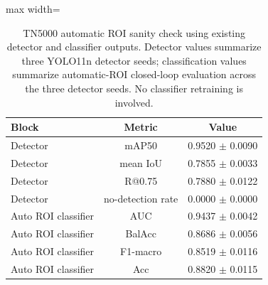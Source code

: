 \begin{table}[t]
    \centering
    \small
    \caption{TN5000 automatic ROI sanity check using existing detector and classifier outputs. Detector values summarize three YOLO11n detector seeds; classification values summarize automatic-ROI closed-loop evaluation across the three detector seeds. No classifier retraining is involved.}
    \label{tab:tn5000_auto_roi_summary}
    \begin{adjustbox}{max width=\columnwidth}
    \begin{tabular}{lcc}
        \toprule
        Block & Metric & Value \\
        \midrule
        Detector & mAP50 & 0.9520 $\pm$ 0.0090 \\
        Detector & mean IoU & 0.7855 $\pm$ 0.0033 \\
        Detector & R@0.75 & 0.7880 $\pm$ 0.0122 \\
        Detector & no-detection rate & 0.0000 $\pm$ 0.0000 \\
        \midrule
        Auto ROI classifier & AUC & 0.9437 $\pm$ 0.0042 \\
        Auto ROI classifier & BalAcc & 0.8686 $\pm$ 0.0056 \\
        Auto ROI classifier & F1-macro & 0.8519 $\pm$ 0.0116 \\
        Auto ROI classifier & Acc & 0.8820 $\pm$ 0.0115 \\
        \bottomrule
    \end{tabular}
    \end{adjustbox}
\end{table}
